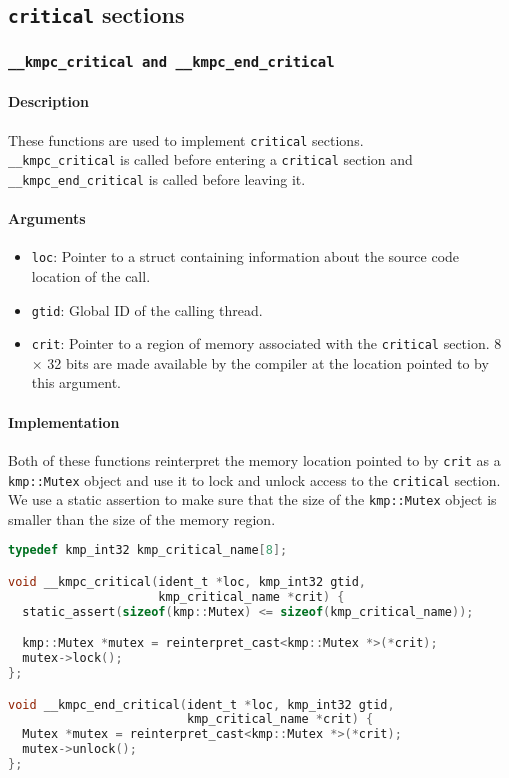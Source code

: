 \subsection{\texttt{critical} sections}

\subsubsection{\texttt{__kmpc_critical and __kmpc_end_critical}}

\paragraph{Description} These functions are used to implement \texttt{critical} sections.\\
\texttt{\_\_kmpc\_critical} is called before entering a \texttt{critical} section and
\texttt{\_\_kmpc\_end\_critical} is called before leaving it.

\paragraph{Arguments}
\begin{itemize}
	\item \texttt{loc}: Pointer to a struct containing information about the source code location
	      of the call.
	\item \texttt{gtid}: Global ID of the calling thread.
	\item \texttt{crit}: Pointer to a region of memory associated with the \texttt{critical} section. 8
	      $\times$ 32 bits are made available by the compiler at the location pointed to by this
	      argument.
\end{itemize}

\paragraph{Implementation} Both of these functions reinterpret the memory location pointed to by
\texttt{crit} as a \texttt{kmp::Mutex} object and use it to lock and unlock access to the
\texttt{critical} section. We use a static assertion to make sure that the size of the
\texttt{kmp::Mutex} object is smaller than the size of the memory region.

\begin{lstlisting}[language=C, caption={__kmpc_critical and __kmpc_end_critical},
                   label={lst:kmpc-critical}, escapechar=@]
typedef kmp_int32 kmp_critical_name[8];

void __kmpc_critical(ident_t *loc, kmp_int32 gtid,
                     kmp_critical_name *crit) {
  static_assert(sizeof(kmp::Mutex) <= sizeof(kmp_critical_name));

  kmp::Mutex *mutex = reinterpret_cast<kmp::Mutex *>(*crit);
  mutex->lock();
};

void __kmpc_end_critical(ident_t *loc, kmp_int32 gtid,
                         kmp_critical_name *crit) {
  Mutex *mutex = reinterpret_cast<kmp::Mutex *>(*crit);
  mutex->unlock();
};
\end{lstlisting}

